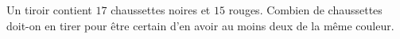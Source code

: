 
\begin{exercice}\label{exosmath-0191}

Un tiroir contient \( 17\) chaussettes noires et \( 15\) rouges. Combien de chaussettes doit-on en tirer pour être certain d'en avoir au moins deux de la même couleur.

\end{exercice}
